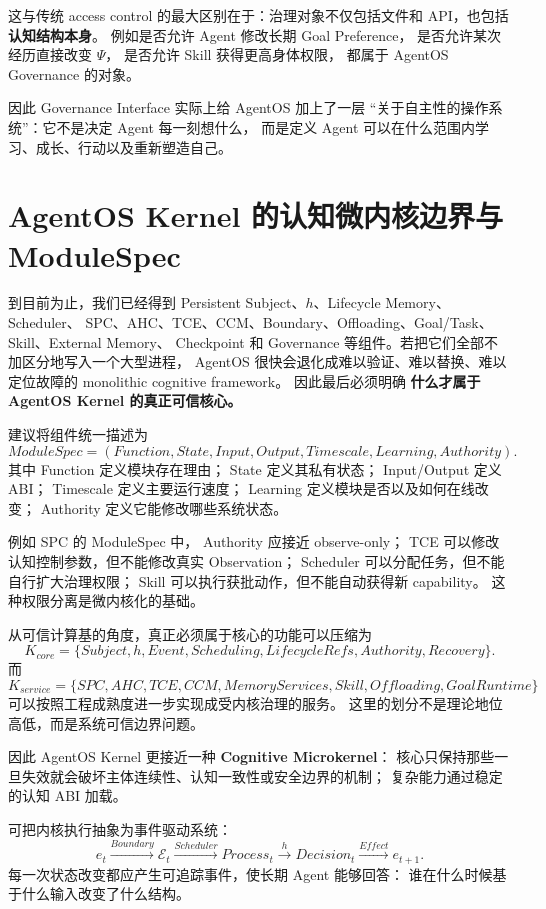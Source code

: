 这与传统 access control 的最大区别在于：治理对象不仅包括文件和 API，也包括
\textbf{认知结构本身}。
例如是否允许 Agent 修改长期 Goal Preference，
是否允许某次经历直接改变 $\Psi$，
是否允许 Skill 获得更高身体权限，
都属于 AgentOS Governance 的对象。

因此 Governance Interface 实际上给 AgentOS 加上了一层
``关于自主性的操作系统''：它不是决定 Agent 每一刻想什么，
而是定义 Agent 可以在什么范围内学习、成长、行动以及重新塑造自己。


\section{AgentOS Kernel 的认知微内核边界与 ModuleSpec}

到目前为止，我们已经得到 Persistent Subject、$h$、Lifecycle Memory、Scheduler、
SPC、AHC、TCE、CCM、Boundary、Offloading、Goal/Task、Skill、External Memory、
Checkpoint 和 Governance 等组件。若把它们全部不加区分地写入一个大型进程，
AgentOS 很快会退化成难以验证、难以替换、难以定位故障的 monolithic cognitive framework。
因此最后必须明确
\textbf{什么才属于 AgentOS Kernel 的真正可信核心。}

建议将组件统一描述为
\[
\boxed{
ModuleSpec
=
(
Function,
State,
Input,
Output,
Timescale,
Learning,
Authority
).
}
\]
其中 Function 定义模块存在理由；
State 定义其私有状态；
Input/Output 定义 ABI；
Timescale 定义主要运行速度；
Learning 定义模块是否以及如何在线改变；
Authority 定义它能修改哪些系统状态。

例如 SPC 的 ModuleSpec 中，
Authority 应接近 observe-only；
TCE 可以修改认知控制参数，但不能修改真实 Observation；
Scheduler 可以分配任务，但不能自行扩大治理权限；
Skill 可以执行获批动作，但不能自动获得新 capability。
这种权限分离是微内核化的基础。

从可信计算基的角度，真正必须属于核心的功能可以压缩为
\[
K_{core}
=
\{
Subject,
h,
Event,
Scheduling,
LifecycleRefs,
Authority,
Recovery
\}.
\]
而
\[
K_{service}
=
\{
SPC,
AHC,
TCE,
CCM,
MemoryServices,
Skill,
Offloading,
GoalRuntime
\}
\]
可以按照工程成熟度进一步实现成受内核治理的服务。
这里的划分不是理论地位高低，而是系统可信边界问题。

因此 AgentOS Kernel 更接近一种
\textbf{Cognitive Microkernel}：
核心只保持那些一旦失效就会破坏主体连续性、认知一致性或安全边界的机制；
复杂能力通过稳定的认知 ABI 加载。

可把内核执行抽象为事件驱动系统：
\[
e_t
\xrightarrow{Boundary}
\mathcal E_t
\xrightarrow{Scheduler}
Process_t
\xrightarrow{h}
Decision_t
\xrightarrow{Effect}
e_{t+1}.
\]
每一次状态改变都应产生可追踪事件，使长期 Agent 能够回答：
谁在什么时候基于什么输入改变了什么结构。

